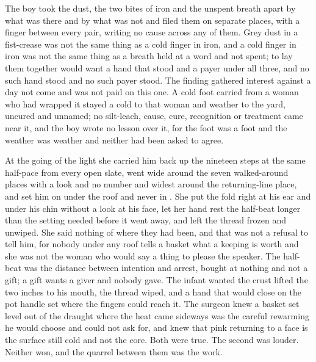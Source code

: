 The boy took the dust, the two bites of iron and the unspent breath apart by what was there and by what was not and filed them on separate places, with a finger between every pair, writing no cause across any of them. Grey dust in a fist-crease was not the same thing as a cold finger in iron, and a cold finger in iron was not the same thing as a breath held at a word and not spent; to lay them together would want a hand that stood and a payer under all three, and no such hand stood and no such payer stood. The finding gathered interest against a day not come and was not paid on this one. A cold foot carried from a woman who had wrapped it stayed a cold to that woman and weather to the yard, uncured and unnamed; no silt-leach, cause, cure, recognition or treatment came near it, and the boy wrote no lesson over it, for the foot was a foot and the weather was weather and neither had been asked to agree.

\scenebreak

At the going of the light she carried him back up the nineteen steps at the same half-pace from every open slate, went wide around the seven walked-around places with a look and no number and widest around the returning-line place, and set him on  under the roof and never in . She put the fold right at his ear and under his chin without a look at his face, let her hand rest the half-beat longer than the setting needed before it went away, and left the thread frozen and unwiped. She said nothing of where they had been, and that was not a refusal to tell him, for nobody under any roof tells a basket what a keeping is worth and she was not the woman who would say a thing to please the speaker. The half-beat was the distance between intention and arrest, bought at nothing and not a gift; a gift wants a giver and nobody gave. The infant wanted the crust lifted the two inches to his mouth, the thread wiped, and a hand that would close on the pot handle set where the fingers could reach it. The surgeon knew a basket set level out of the draught where the heat came sideways was the careful rewarming he would choose and could not ask for, and knew that pink returning to a face is the surface still cold and not the core. Both were true. The second was louder. Neither won, and the quarrel between them was the work.

